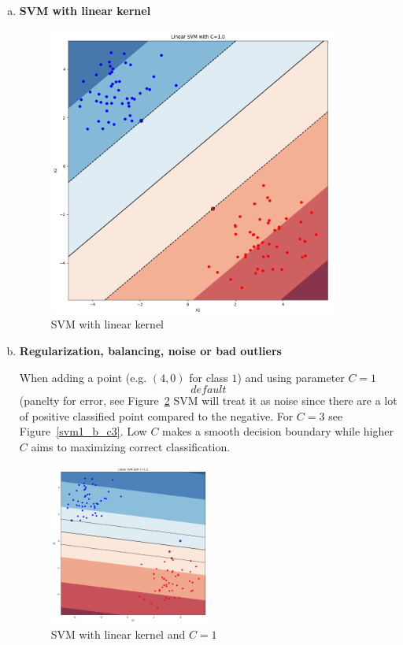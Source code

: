 \documentclass[12pt,a4paper]{article}
\begin{document}
\newpage
\begin{enumerate}[a)]
  
  
  \item \textbf{SVM with linear kernel}
  
\begin{figure}[H]
	\centering
  \includegraphics[width=0.9\textwidth]{figures/svm1.png}
	\caption{SVM with linear kernel}
	\label{svm1}
\end{figure}

\newpage
  \item \textbf{Regularization, balancing, noise or bad outliers}

When adding a point (e.g. $(4,0)$ for class $1$) and using parameter $C = 1$
\[default\] (panelty for error, see Figure\ \ref{svm1_b_c1} SVM will treat it
as noise since there are a lot of positive classified point compared to the negative. For
$C = 3$ see Figure\ \ref{svm1_b_c3}. Low $C$ makes a smooth decision boundary while higher $C$ aims to
maximizing correct
classification\autocite{scikit:svm}\autocite{scikit:svm_parameters}.

\begin{figure}[H]
	\centering
  \includegraphics[width=0.5\textwidth]{figures/svm1_b_c1.png}
	\caption{SVM with linear kernel and $C=1$}
	\label{svm1_b_c1}
\end{figure}


\end{enumerate}
\end{document}
